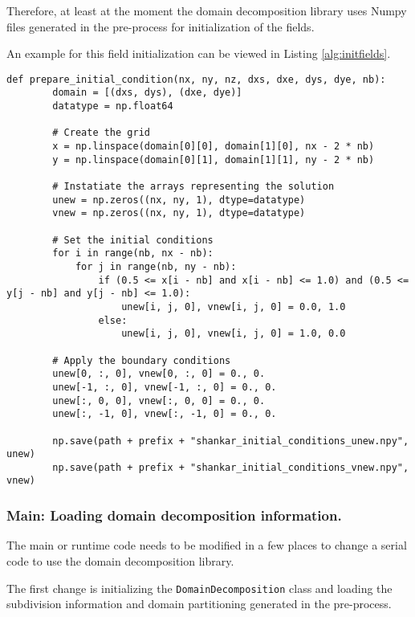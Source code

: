 Therefore, at least at the moment the domain decomposition library uses Numpy files generated in the pre-process for initialization of the fields.

An example for this field initialization can be viewed in Listing \ref{alg:initfields}.

\begin{lstlisting}[caption={Example code of the domain pre-process function to initialize to fields "unew" and "vnew"},captionpos=b, label={alg:initfields}, float, floatplacement=H]
def prepare_initial_condition(nx, ny, nz, dxs, dxe, dys, dye, nb):
        domain = [(dxs, dys), (dxe, dye)]
        datatype = np.float64

        # Create the grid
        x = np.linspace(domain[0][0], domain[1][0], nx - 2 * nb)
        y = np.linspace(domain[0][1], domain[1][1], ny - 2 * nb)

        # Instatiate the arrays representing the solution
        unew = np.zeros((nx, ny, 1), dtype=datatype)
        vnew = np.zeros((nx, ny, 1), dtype=datatype)

        # Set the initial conditions
        for i in range(nb, nx - nb):
            for j in range(nb, ny - nb):
                if (0.5 <= x[i - nb] and x[i - nb] <= 1.0) and (0.5 <= y[j - nb] and y[j - nb] <= 1.0):
                    unew[i, j, 0], vnew[i, j, 0] = 0.0, 1.0
                else:
                    unew[i, j, 0], vnew[i, j, 0] = 1.0, 0.0

        # Apply the boundary conditions
        unew[0, :, 0], vnew[0, :, 0] = 0., 0.
        unew[-1, :, 0], vnew[-1, :, 0] = 0., 0.
        unew[:, 0, 0], vnew[:, 0, 0] = 0., 0.
        unew[:, -1, 0], vnew[:, -1, 0] = 0., 0.

        np.save(path + prefix + "shankar_initial_conditions_unew.npy", unew)
        np.save(path + prefix + "shankar_initial_conditions_vnew.npy", vnew)
\end{lstlisting}

\subsubsection{Main: Loading domain decomposition information.}
\label{sec:main_loading}
The main or runtime code needs to be modified in a few places to change a serial code to use the domain decomposition library.

The first change is initializing the \texttt{DomainDecomposition} class and loading the subdivision information and domain partitioning generated in the pre-process.

